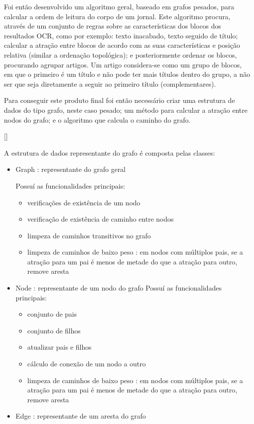 Foi então desenvolvido um algoritmo geral, baseado em grafos pesados, para calcular a ordem de leitura do corpo de um jornal. Este algoritmo procura, através de um conjunto de regras sobre as características dos blocos dos resultados OCR, como por exemplo: texto inacabado, texto seguido de título; calcular a atração entre blocos de acordo com as suas características e posição relativa (similar a ordenação topológica); e posteriormente ordenar os blocos, procurando agrupar artigos. Um artigo considera-se como um grupo de blocos, em que o primeiro é um título e não pode ter mais títulos dentro do grupo, a não ser que seja diretamente a seguir ao primeiro título (complementares).

Para conseguir este produto final foi então necessário criar uma estrutura de dados do tipo grafo, neste caso pesado; um método para calcular a atração entre nodos do grafo; e o algoritmo que calcula o caminho do grafo.

[\normalsize]

A estrutura de dados representante do grafo é composta pelas classes:

\begin{itemize}\setlength\itemsep{-0.3em}
	\item Graph : representante do grafo geral
	
		Possuí as funcionalidades principais:
		\begin{itemize}\setlength\itemsep{-0.8em}
			\item verificações de existência de um nodo
			\item verificação de existência de caminho entre nodos
			\item limpeza de caminhos transitivos no grafo
			\item limpeza de caminhos de baixo peso : em nodos com múltiplos pais, se a atração para um pai é menos de metade do que a atração para outro, remove aresta
		\end{itemize}
	\item Node : representante de um nodo do grafo
		Possuí as funcionalidades principais:
		\begin{itemize}\setlength\itemsep{-0.8em}
			\item conjunto de pais
			\item conjunto de filhos
			\item atualizar pais e filhos
			\item cálculo de conexão de um nodo a outro
			\item limpeza de caminhos de baixo peso : em nodos com múltiplos pais, se a atração para um pai é menos de metade do que a atração para outro, remove aresta
		\end{itemize}
	\item Edge : representante de um aresta do grafo
\end{itemize}



